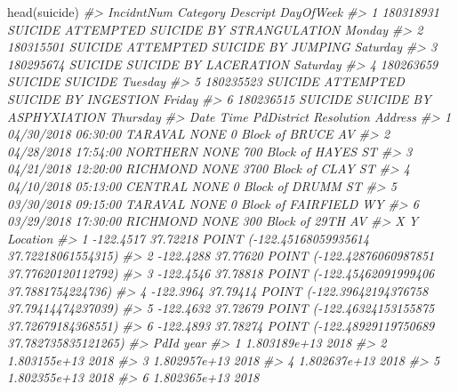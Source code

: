 \documentclass[
]{krantz}
\makeatletter
\newenvironment{Shaded}{\begin{snugshade}}{\end{snugshade}}
\newcommand{\CommentTok}[1]{\textcolor[rgb]{0.37,0.37,0.37}{\textit{#1}}}
\newcommand{\FunctionTok}[1]{\textcolor[rgb]{0,0,0}{#1}}
\newcommand{\NormalTok}[1]{#1}
\newenvironment{kframe}{%
\medskip{}
\setlength{\fboxsep}{.8em}
 \def\at@end@of@kframe{}%
 \ifinner\ifhmode%
  \def\at@end@of@kframe{\end{minipage}}%
  \begin{minipage}{\columnwidth}%
 \fi\fi%
 \def\FrameCommand##1{\hskip\@totalleftmargin \hskip-\fboxsep
 \colorbox{shadecolor}{##1}\hskip-\fboxsep
     \hskip-\linewidth \hskip-\@totalleftmargin \hskip\columnwidth}%
 \MakeFramed {\advance\hsize-\width
   \@totalleftmargin\z@ \linewidth\hsize
   \@setminipage}}%
 {\par\unskip\endMakeFramed%
 \at@end@of@kframe}
\renewenvironment{Shaded}{\begin{kframe}}{\end{kframe}}
\makeatother
\begin{document}
\begin{Shaded}
\begin{Highlighting}[]
\FunctionTok{head}\NormalTok{(suicide)}
\CommentTok{\#\textgreater{}   IncidntNum Category                           Descript DayOfWeek}
\CommentTok{\#\textgreater{} 1  180318931  SUICIDE ATTEMPTED SUICIDE BY STRANGULATION    Monday}
\CommentTok{\#\textgreater{} 2  180315501  SUICIDE       ATTEMPTED SUICIDE BY JUMPING  Saturday}
\CommentTok{\#\textgreater{} 3  180295674  SUICIDE              SUICIDE BY LACERATION  Saturday}
\CommentTok{\#\textgreater{} 4  180263659  SUICIDE                            SUICIDE   Tuesday}
\CommentTok{\#\textgreater{} 5  180235523  SUICIDE     ATTEMPTED SUICIDE BY INGESTION    Friday}
\CommentTok{\#\textgreater{} 6  180236515  SUICIDE            SUICIDE BY ASPHYXIATION  Thursday}
\CommentTok{\#\textgreater{}         Date     Time PdDistrict Resolution                 Address}
\CommentTok{\#\textgreater{} 1 04/30/2018 06:30:00    TARAVAL       NONE     0 Block of BRUCE AV}
\CommentTok{\#\textgreater{} 2 04/28/2018 17:54:00   NORTHERN       NONE   700 Block of HAYES ST}
\CommentTok{\#\textgreater{} 3 04/21/2018 12:20:00   RICHMOND       NONE   3700 Block of CLAY ST}
\CommentTok{\#\textgreater{} 4 04/10/2018 05:13:00    CENTRAL       NONE     0 Block of DRUMM ST}
\CommentTok{\#\textgreater{} 5 03/30/2018 09:15:00    TARAVAL       NONE 0 Block of FAIRFIELD WY}
\CommentTok{\#\textgreater{} 6 03/29/2018 17:30:00   RICHMOND       NONE    300 Block of 29TH AV}
\CommentTok{\#\textgreater{}           X        Y                                       Location}
\CommentTok{\#\textgreater{} 1 {-}122.4517 37.72218  POINT ({-}122.45168059935614 37.72218061554315)}
\CommentTok{\#\textgreater{} 2 {-}122.4288 37.77620  POINT ({-}122.42876060987851 37.77620120112792)}
\CommentTok{\#\textgreater{} 3 {-}122.4546 37.78818   POINT ({-}122.45462091999406 37.7881754224736)}
\CommentTok{\#\textgreater{} 4 {-}122.3964 37.79414  POINT ({-}122.39642194376758 37.79414474237039)}
\CommentTok{\#\textgreater{} 5 {-}122.4632 37.72679  POINT ({-}122.46324153155875 37.72679184368551)}
\CommentTok{\#\textgreater{} 6 {-}122.4893 37.78274 POINT ({-}122.48929119750689 37.782735835121265)}
\CommentTok{\#\textgreater{}           PdId year}
\CommentTok{\#\textgreater{} 1 1.803189e+13 2018}
\CommentTok{\#\textgreater{} 2 1.803155e+13 2018}
\CommentTok{\#\textgreater{} 3 1.802957e+13 2018}
\CommentTok{\#\textgreater{} 4 1.802637e+13 2018}
\CommentTok{\#\textgreater{} 5 1.802355e+13 2018}
\CommentTok{\#\textgreater{} 6 1.802365e+13 2018}
\end{Highlighting}
\end{Shaded}
\end{document}
